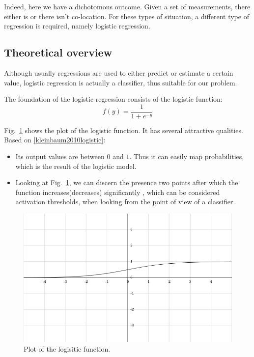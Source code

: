Indeed, here we have a dichotomous outcome. Given a set of measurements, there either is or there isn't co-location. For these types of situation, a different type of regression is required, namely logistic regression. 

\subsection{Theoretical overview}

Although usually regressions are used to either predict or estimate a certain value, logistic regression is actually a classifier, thus suitable for our problem. 

The foundation of the logistic regression consists of the logistic function:
\begin{equation*}
f(y) = \frac{1}{1+e^{-y}}
\end{equation*}

Fig.~\ref{pic:logit} shows the plot of the logistic function. It has several attractive qualities. Based on \ref{kleinbaum2010logistic}:

\begin{itemize}
  \item Its output values are between $0$ and $1$. Thus it can easily map probabilities, which is the result of the logistic model.
  \item Looking at Fig.~\ref{pic:logit}, we can discern the presence two points after which the function increases(decreases) significantly , which can be considered activation thresholds, when looking from the point of view of a classifier.  
\end{itemize}

\begin{figure}[h]
	\begin{center}
		\includegraphics[scale=0.5]{figures/logit.png}
	\end{center}
	
	\caption{Plot of the logisitic function.}
	\label{pic:logit}

\end{figure}

